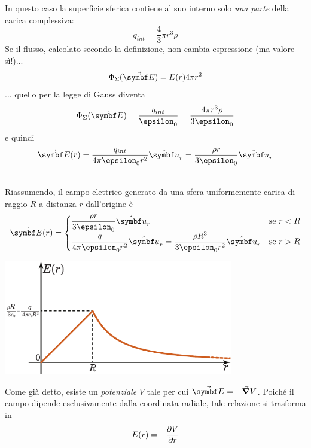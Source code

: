 \begin{minipage}{0.54\textwidth}
	In questo caso la superficie sferica contiene al suo interno solo \textit{una parte} della carica complessiva:
	\begin{equation*}
		q_{int}=\frac{4}{3}\pi r^3\rho
	\end{equation*}
	Se il flusso, calcolato secondo la definizione, non cambia espressione (ma valore sì!)...
	\begin{equation*}
		\Phi_{\Sigma}(\vba{E})=E(r)4\pi r^2
	\end{equation*}
	... quello per la legge di Gauss diventa
	\begin{equation*}
		\Phi_{\Sigma}(\vba{E})=\frac{q_{int}}{\epsilon_0}=\frac{4 \pi r^3\rho}{3\epsilon_0}
	\end{equation*}
	e quindi
	\begin{equation}
		\vba{E}(r)=\frac{q_{int}}{4\pi\epsilon_0 r^2}\vbh{u}_r=\frac{\rho r}{3\epsilon_0}\vbh{u}_r
	\end{equation}
\end{minipage}\\
Riassumendo, il campo elettrico generato da una sfera uniformemente carica di raggio $R$ a distanza $r$ dall'origine è
\begin{equation}
	\vba{E}(r)=\begin{cases}
		\displaystyle\frac{\rho r}{3\epsilon_0}\vbh{u}_r&\text{se}\ r< R\\
		\displaystyle\frac{q}{4\pi\epsilon_0 r^2}\vbh{u}_r=\frac{\rho R^3}{3\epsilon_0r^2}\vbh{u}_r &\text{se}\ r> R
	\end{cases}
\end{equation}
\begin{center}
	\includegraphics[width=0.75\textwidth]{images/chp2/chp2sferagraf1.pdf}
\end{center}
Come già detto, esiste un \textit{potenziale} $V$ tale per cui $\vba{E}=-\grad{V}$. Poiché il campo dipende esclusivamente dalla coordinata radiale, tale relazione si trasforma in
\begin{equation*}
	E(r)=-\pdv{V}{r}
\end{equation*}
